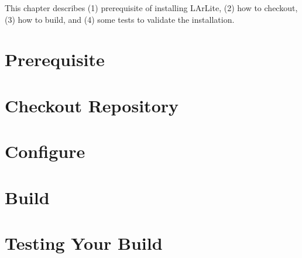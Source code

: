
This chapter describes (1) prerequisite of installing LArLite, (2) how to checkout, (3) how to build, and (4) some tests to validate the installation.

\section{Prerequisite}
\label{sec:prerequisite}


\section{Checkout Repository}
\label{sec:checkout}


\section{Configure}
\label{sec:configure}


\section{Build}
\label{sec:build}


\section{Testing Your Build}
\label{sec:simpletest}


